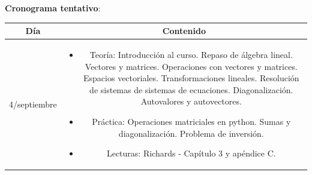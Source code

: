 \documentclass[11pt]{article}
\begin{document}
\newpage
\textbf {\large Cronograma tentativo}:

\begin{longtable}[h!]{| c | c | }
\hline
\textbf{Día} & \textbf{Contenido} \\

\hline
4/septiembre & \begin{minipage}{.65\textwidth}
\begin{itemize} 
    \vspace{1mm}
\item Teoría: Introducción al curso. Repaso de álgebra lineal. Vectores y matrices. Operaciones con vectores y matrices. Espacios vectoriales. Transformaciones lineales. Resolución de sistemas de sistemas de ecuaciones. Diagonalización. Autovalores y autovectores.
	  \item Práctica: Operaciones matriciales en python. Sumas y diagonalización. Problema de inversión. 
	\item Lecturas: Richards - Capítulo 3 y apéndice C. 
    \vspace{1mm}
\end{itemize}
\end{minipage} \\


\end{longtable}
\end{document}
